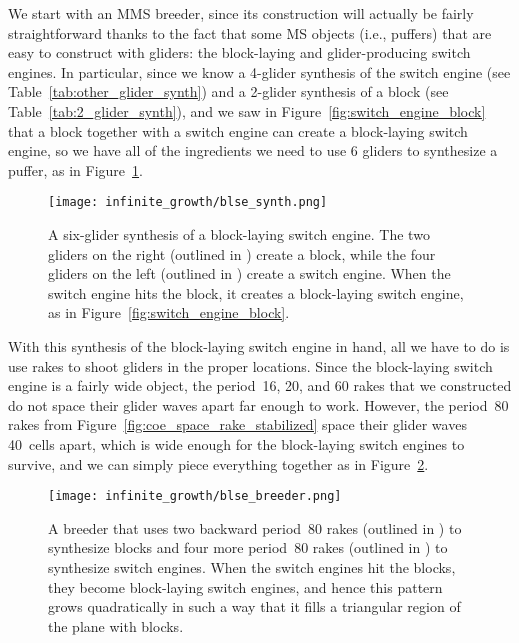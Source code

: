 We start with an MMS breeder, since its construction will actually be fairly straightforward thanks to the fact that some MS objects (i.e., puffers) that are easy to construct with gliders: the block-laying and glider-producing switch engines. In particular, since we know a 4-glider synthesis of the switch engine (see Table~\ref{tab:other_glider_synth}) and a 2-glider synthesis of a block (see Table~\ref{tab:2_glider_synth}), and we saw in Figure~\ref{fig:switch_engine_block} that a block together with a switch engine can create a block-laying switch engine, so we have all of the ingredients we need to use $6$ gliders to synthesize a puffer, as in Figure~\ref{fig:blse_synth}.
\begin{figure}[!ht]
	\centering\texttt{[image: infinite\_growth/blse\_synth.png]}
	\caption{A six-glider synthesis of a block-laying switch engine. The two gliders on the right (outlined in ) create a block, while the four gliders on the left (outlined in ) create a switch engine. When the switch engine hits the block, it creates a block-laying switch engine, as in Figure~\ref{fig:switch_engine_block}.}\label{fig:blse_synth}
\end{figure}

With this synthesis of the block-laying switch engine in hand, all we have to do is use rakes to shoot gliders in the proper locations. Since the block-laying switch engine is a fairly wide object, the period~16, 20, and 60 rakes that we constructed do not space their glider waves apart far enough to work. However, the period~80 rakes from Figure~\ref{fig:coe_space_rake_stabilized} space their glider waves 40~cells apart, which is wide enough for the block-laying switch engines to survive, and we can simply piece everything together as in Figure~\ref{fig:blse_breeder}.
\begin{figure}[!ht]
	\centering\texttt{[image: infinite\_growth/blse\_breeder.png]}
	\caption{A breeder that uses two backward period~80 rakes (outlined in ) to synthesize blocks and four more period~80 rakes (outlined in ) to synthesize switch engines. When the switch engines hit the blocks, they become block-laying switch engines, and hence this pattern grows quadratically in such a way that it fills a triangular region of the plane with blocks.}\label{fig:blse_breeder}
\end{figure}

